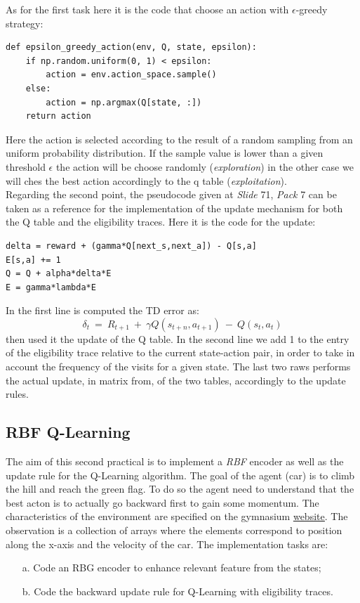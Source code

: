 \documentclass[10pt,a4paper]{article}
\begin{document}
\noindent As for the first task here it is the code that choose an action with $\epsilon$-greedy strategy:
\begin{lstlisting}
def epsilon_greedy_action(env, Q, state, epsilon):
    if np.random.uniform(0, 1) < epsilon:
        action = env.action_space.sample()  
    else:
        action = np.argmax(Q[state, :])
    return action
\end{lstlisting}
\vspace{5pt}

\noindent Here the action is selected according to the result of a random sampling from an uniform probability distribution. If the sample value is lower than a given threshold $\epsilon$ the action will be choose randomly (\textit{exploration}) in the other case we will ches the best action accordingly to the q table (\textit{exploitation}).\\

\noindent Regarding the second point, the pseudocode given at \textit{Slide} 71, \textit{Pack} 7 can be taken as a reference for the implementation of the update mechanism for both the Q table and the eligibility traces. Here it is the code for the update:
\begin{lstlisting}
delta = reward + (gamma*Q[next_s,next_a]) - Q[s,a]
E[s,a] += 1
Q = Q + alpha*delta*E
E = gamma*lambda*E
\end{lstlisting}
In the first line is computed the TD error as: 
\begin{equation}
    \delta_t  \:=\: R_{t+1} \:+\: \gamma Q(s_{t+n}, a_{t+1}) \:-\: Q(s_t, a_t)
\end{equation}
then used it the update of the Q table. In the second line we add 1 to the entry of the eligibility trace relative to the current state-action pair, in order to take in account the frequency of the visits for a given state. The last two raws performs the actual update, in matrix from, of the two tables, accordingly to the update rules.
\newpage
\subsection{RBF Q-Learning}
The aim of this second practical is to implement a \textit{RBF} encoder as well as the update rule for the Q-Learning algorithm. The goal of the agent (car) is to climb the hill and reach the green flag. To do so the agent need to understand that the best acton is to actually go backward first to gain some momentum. The characteristics of the environment are specified on the gymnasium \href{https://gymnasium.farama.org/environments/classic_control/mountain_car/}{\underline{website}}. The observation is a collection of arrays where the elements correspond to position  along the x-axis and the velocity of the car.
 The implementation tasks are:
\begin{itemize}
    \item[a.] Code an RBG encoder to enhance relevant feature from the states;
    \item[b.] Code the backward update rule for Q-Learning with eligibility traces.
\end{itemize}
\end{document}
